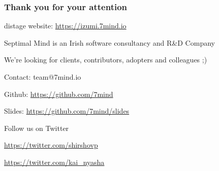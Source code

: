 \documentclass[usenames,dvipsnames,aspectratio=169]{beamer}
\begin{document}
\begin{frame}
    \frametitle{Thank you for your attention}
    \begin{center}
      distage website: \url{https://izumi.7mind.io}
    \end{center}
    \begin{center}
      \color{RubineRed}
      Septimal Mind is an Irish software consultancy and R\&D Company

      \vspace{0.3cm}
      We're looking for clients, contributors, adopters and colleagues ;)
    \end{center}
    \begin{center}
      Contact: team@7mind.io

      \vspace{0.3cm}
      Github: \url{https://github.com/7mind}

      \vspace{0.3cm}
      Slides: \url{https://github.com/7mind/slides}
    \end{center}
    \begin{center}
      \color{RoyalBlue}
      Follow us on Twitter

      \vspace{0.3cm}
      \url{https://twitter.com/shirshovp}

      \vspace{0.3cm}
      \url{https://twitter.com/kai_nyasha}
    \end{center}
\end{frame}
\end{document}
